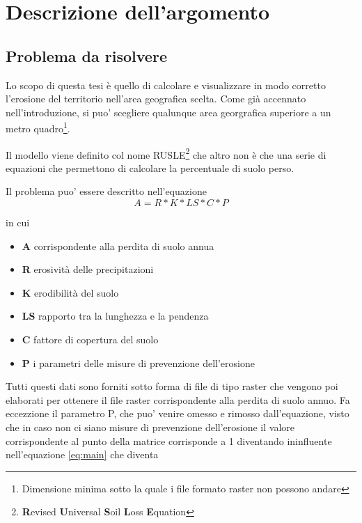 
\chapter{Descrizione dell'argomento}
\label{cap:descrizione}
\section{Problema da risolvere}
\label{problemadarisolvere}
Lo scopo di questa tesi è quello di calcolare e visualizzare in modo corretto l'erosione del territorio nell'area geografica scelta. Come già accennato nell'introduzione, si puo' scegliere qualunque area georgrafica superiore a un metro quadro\footnote{Dimensione minima sotto la quale i file formato raster non possono andare}.

Il modello viene definito col nome RUSLE\footnote{\textbf{R}evised \textbf{U}niversal \textbf{S}oil \textbf{L}oss \textbf{E}quation} che altro non è che una serie di equazioni che permettono di calcolare la percentuale di suolo perso.

Il problema puo' essere descritto nell'equazione
\begin{equation} \label{eq:main}
A = R * K * LS * C * P
\end{equation}

in cui
\begin{itemize} 
	\item \textbf{A} corrispondente alla perdita di suolo annua
	\item \textbf{R} erosività delle precipitazioni
	\item \textbf{K} erodibilità del suolo
	\item \textbf{LS} rapporto tra la lunghezza e la pendenza
	\item \textbf{C} fattore di copertura del suolo
	\item \textbf{P} i parametri delle misure di prevenzione dell'erosione
\end{itemize}

Tutti questi dati sono forniti sotto forma di file di tipo raster che vengono poi elaborati per ottenere il file raster corrispondente alla perdita di suolo annuo. Fa eccezzione il parametro P, che puo' venire omesso e rimosso dall'equazione, visto che in caso non ci siano misure di prevenzione dell'erosione il valore corrispondente al punto della matrice corrisponde a 1 diventando ininfluente nell'equazione \ref{eq:main} che diventa

